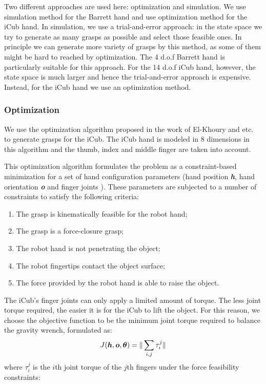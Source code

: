 Two different approaches are used here: optimization and simulation. We use simulation method for the Barrett hand and use optimization method for the iCub hand. In simulation, we use a trial-and-error approach: in the state space we try to generate as many grasps as possible and select those feasible ones. In principle we can generate more variety of grasps by this method, as some of them might be hard to reached by optimization. The 4 d.o.f Barrett hand is particularly suitable for this approach. For the 14 d.o.f iCub hand, however, the state space is much larger and hence the trial-and-error approach is expensive. Instead, for the iCub hand we use an optimization method.


\subsubsection{Optimization}
We use the optimization algorithm proposed in the work of El-Khoury and etc.~\citep{el2013generation} to generate grasps for the iCub.
The iCub hand is modeled in 8 dimensions in this algorithm and the thumb, index and middle finger are taken into account.

This optimization algorithm formulates the problem as a constraint-based minimization for a set of hand configuration parameters (hand position \textbf{\emph{h}}, hand orientation {\textbf{\emph{o}}} and finger joints {\boldsymbol{$\theta$}}). These parameters are subjected to a number of constraints to satisfy the following criteria:

\begin{enumerate}
\item The grasp is kinematically feasible for the robot hand;
\item The grasp is a force-closure grasp;
\item The robot hand is not penetrating the object;
\item The robot fingertips contact the object surface;
\item The force provided by the robot hand is able to raise the object.
\end{enumerate}


The iCub's finger joints can only apply a limited amount of torque.
The less joint torque required, the easier it is for the iCub to lift the object. For this reason, we choose the objective function to be the minimum joint torque required to balance the gravity wrench, formulated as:
\begin{equation}
J(\boldsymbol{h},\boldsymbol{o},\boldsymbol{\theta})=\Arrowvert \sum_{i,j} {{\tau}^j_i}\Arrowvert
 \label{quality}
 \end{equation}
where {$\tau$}$^j_i$ is the $i$th joint torque of the $j$th fingers under the force feasibility constraints:

